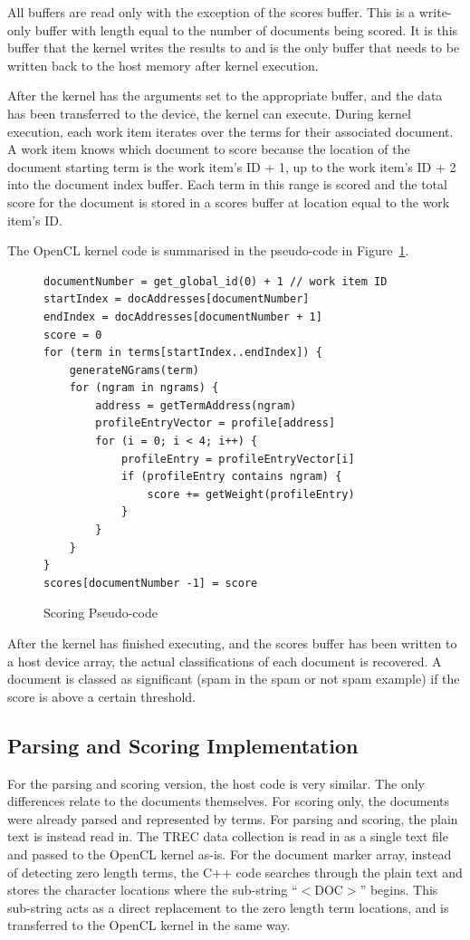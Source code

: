 All buffers are read only with the exception of the scores buffer. This is a
write-only buffer with length equal to the number of documents being scored. It
is this buffer that the kernel writes the results to and is the only buffer that
needs to be written back to the host memory after kernel execution.

After the kernel has the arguments set to the appropriate buffer, and the data
has been transferred to the device, the kernel can execute. During kernel
execution, each work item iterates over the terms for their associated document.
A work item knows which document to score because the location of the document
starting term is the work item's ID + 1, up to the work item's ID + 2 into the
document index buffer. Each term in this range is scored and the total score for
the document is stored in a scores buffer at location equal to the work item's
ID.

The OpenCL kernel code is summarised in the pseudo-code in
Figure~\ref{fig:scoringPseudocode}.

\begin{figure}
\small\begin{verbatim}
documentNumber = get_global_id(0) + 1 // work item ID
startIndex = docAddresses[documentNumber]
endIndex = docAddresses[documentNumber + 1]
score = 0
for (term in terms[startIndex..endIndex]) {
    generateNGrams(term)
    for (ngram in ngrams) {
        address = getTermAddress(ngram)
        profileEntryVector = profile[address]
        for (i = 0; i < 4; i++) {
            profileEntry = profileEntryVector[i]
            if (profileEntry contains ngram) {
                score += getWeight(profileEntry)
            }
        }
    }
}
scores[documentNumber -1] = score
\end{verbatim}
\caption{Scoring Pseudo-code}
\label{fig:scoringPseudocode}
\end{figure}

After the kernel has finished executing, and the scores buffer has been written
to a host device array, the actual classifications of each document is
recovered. A document is classed as significant (spam in the spam or not spam
example) if the score is above a certain threshold.

\subsection{Parsing and Scoring Implementation}

For the parsing and scoring version, the host code is very similar. The only
differences relate to the documents themselves. For scoring only, the documents
were already parsed and represented by terms. For parsing and scoring, the plain
text is instead read in. The TREC data collection is read in as a single text
file and passed to the OpenCL kernel as-is. For the document marker array,
instead of detecting zero length terms, the C++ code searches through the plain
text and stores the character locations where the sub-string ``$<$DOC$>$''
begins. This sub-string acts as a direct replacement to the zero length term
locations, and is transferred to the OpenCL kernel in the same way.

